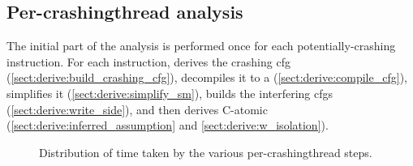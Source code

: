 \subsection{Per-\gls{crashingthread} analysis}

The initial part of the analysis is performed once for each
potentially-crashing instruction.  For each instruction, {\technique}
derives the crashing \gls{cfg}
(\autoref{sect:derive:build_crashing_cfg}), decompiles it to a
{\StateMachine} (\autoref{sect:derive:compile_cfg}), simplifies it
(\autoref{sect:derive:simplify_sm}), builds the interfering
\glspl{cfg} (\autoref{sect:derive:write_side}), and then derives
C-atomic (\autoref{sect:derive:inferred_assumption} and
\autoref{sect:derive:w_isolation}).

\begin{figure}
  \centerline{
  }
  \caption{Distribution of time taken by the various
    per-\gls{crashingthread} steps. \label{fig:eval:how:per_crashing_times}}
\end{figure}

